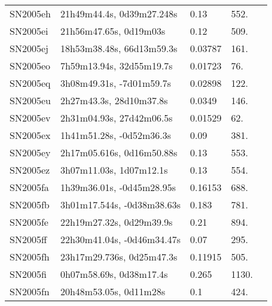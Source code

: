 \begin{longtable}{lllll}
         SN2005eh &      21h49m44.4s, 0d39m27.248s &     0.13 &           552. &    \citet{2005CBET..229A...1B} \\
         SN2005ei &         21h56m47.65s, 0d19m03s &     0.12 &           509. &    \citet{2005CBET..229A...1B} \\
         SN2005ej &      18h53m38.48s, 66d13m59.3s &  0.03787 &           161. &    \citet{1999PASP..111..438F} \\
         SN2005eo &       7h59m13.94s, 32d55m19.7s &  0.01723 &            76. &    \citet{2006ApJS..167....1B} \\
         SN2005eq &       3h08m49.31s, -7d01m59.7s &  0.02898 &           122. &    \citet{2003SDSS1.C...0000:} \\
         SN2005eu &        2h27m43.3s, 28d10m37.8s &   0.0349 &           146. &    \citet{2005CBET..244A...1:} \\
         SN2005ev &       2h31m04.93s, 27d42m06.5s &  0.01529 &            62. &    \citet{2008AJ....135..588S} \\
         SN2005ex &       1h41m51.28s, -0d52m36.3s &     0.09 &           381. &    \citet{2005CBET..247A...1B} \\
         SN2005ey &      2h17m05.616s, 0d16m50.88s &     0.13 &           553. &    \citet{2005CBET..247A...1B} \\
         SN2005ez &        3h07m11.03s, 1d07m12.1s &     0.13 &           554. &    \citet{2005CBET..247A...1B} \\
         SN2005fa &      1h39m36.01s, -0d45m28.95s &  0.16153 &           688. &    \citet{2003SDSS1.C...0000:} \\
         SN2005fb &     3h01m17.544s, -0d38m38.63s &    0.183 &           781. &    \citet{2011ApJ...740...92G} \\
         SN2005fe &       22h19m27.32s, 0d29m39.9s &     0.21 &           894. &    \citet{2005CBET..247A...1B} \\
         SN2005ff &     22h30m41.04s, -0d46m34.47s &     0.07 &           295. &    \citet{2005CBET..247A...1B} \\
         SN2005fh &      23h17m29.736s, 0d25m47.3s &  0.11915 &           505. &    \citet{2011ApJ...740...92G} \\
         SN2005fi &        0h07m58.69s, 0d38m17.4s &    0.265 &          1130. &    \citet{2011ApJ...740...92G} \\
         SN2005fn &         20h48m53.05s, 0d11m28s &      0.1 &           424. &    \citet{2005CBET..247A...1B} \\

\end{longtable}
